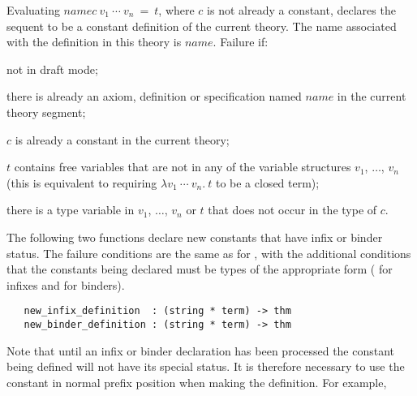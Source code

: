 \noindent Evaluating
 $name$$c\ v_1\ \cdots\ v_n\ =\ t$,
where $c$ is not already a constant, declares the sequent
 to be a constant definition
of the current theory. The name associated with the definition in
this theory is $name$.
Failure if:
\begin{myenumerate}
\item not in draft mode;
\item there is already an axiom, definition or specification
named $name$ in the current theory segment;
\item $c$ is already a constant in the current theory;
\item $t$ contains free variables that are not in any of
the variable structures $v_1$, $\dots$, $v_n$ (this is equivalent
to requiring $\lambda v_1\ \cdots\ v_n.\  t$ to be a closed term);
\item there is a type variable in  $v_1$, $\dots$, $v_n$ or $t$
that does not occur in the type of $c$.
\end{myenumerate}

The following two functions declare new constants that have infix or binder
status. The failure conditions are the same as for ,
with the
additional conditions that the constants being declared must be types of
the appropriate form ( for infixes and
 for binders).


\begin{boxed}
\begin{verbatim}
   new_infix_definition  : (string * term) -> thm
   new_binder_definition : (string * term) -> thm
\end{verbatim}\end{boxed}

\noindent Note that until an infix or binder declaration has been processed the
constant being defined will not have its special status. It is therefore
necessary to use
the constant in normal prefix position when making the definition. For example,

